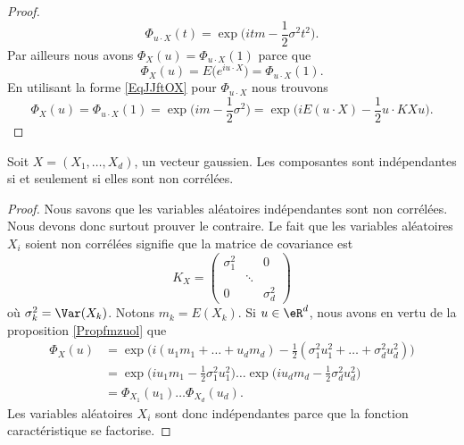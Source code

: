 \begin{proof}
    \begin{equation}    \label{EqJJftOX}
        \Phi_{u\cdot X}(t)=\exp\big( itm-\frac{ 1 }{2}\sigma^2t^2 \big).
    \end{equation}
    Par ailleurs nous avons \( \Phi_X(u)=\Phi_{u\cdot X}(1)\) parce que
    \begin{equation}
        \Phi_X(u)=E\big(  e^{iu\cdot X} \big)=\Phi_{u\cdot X}(1).
    \end{equation}
    En utilisant la forme \eqref{EqJJftOX} pour \( \Phi_{u\cdot X}\) nous trouvons
    \begin{equation}
        \Phi_X(u)=\Phi_{u\cdot X}(1)=\exp\big( im-\frac{ 1 }{2}\sigma^2 \big)=\exp\Big( iE(u\cdot X)-\frac{ 1 }{2}u\cdot KXu \Big).
    \end{equation}
\end{proof}

\begin{theorem} \label{ThoPRkxPdQ}
    Soit \( X=(X_1,\ldots, X_d)\), un vecteur gaussien. Les composantes sont indépendantes si et seulement si elles sont non corrélées.
\end{theorem}

\begin{proof}
    Nous savons que les variables aléatoires indépendantes sont non corrélées. Nous devons donc surtout prouver le contraire. Le fait que les variables aléatoires \( X_i\) soient non corrélées signifie que la matrice de covariance est
    \begin{equation}
        K_X=\begin{pmatrix}
            \sigma_1^2    &       &   0    \\
                &   \ddots    &       \\
            0    &       &   \sigma_d^2
        \end{pmatrix}
    \end{equation}
    où \( \sigma_k^2=\Var(X_k)\). Notons \( m_k=E(X_k)\). Si \( u\in \eR^d\), nous avons en vertu de la proposition \ref{Propfmzuol} que
    \begin{subequations}
        \begin{align}
            \Phi_X(u)&=\exp\Big( i(u_1m_1+\ldots +u_dm_d)-\frac{ 1 }{2}(\sigma_1^2u_1^2+\ldots +\sigma_d^2u_d^2) \Big)\\
            &=\exp\big( iu_1m_1-\frac{ 1 }{2}\sigma_1^2u_1^2 \big)\ldots\exp\big( iu_dm_d-\frac{ 1 }{2}\sigma_d^2u_d^2 \big)\\
            &=\Phi_{X_1}(u_1)\ldots \Phi_{X_d}(u_d).
        \end{align}
    \end{subequations}
    Les variables aléatoires \( X_i\) sont donc indépendantes parce que la fonction caractéristique se factorise.
\end{proof}

